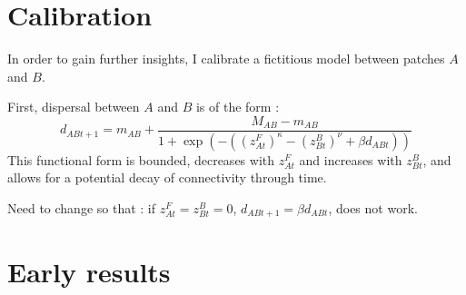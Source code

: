 \documentclass{article}
\begin{document}
\section{Calibration}
In order to gain further insights, I calibrate a fictitious model between patches $A$ and $B$. 

First, dispersal between $A$ and $B$ is of the form :
\begin{equation}
d_{ABt+1} = m_{AB} + \frac{M_{AB} - m_{AB}}{1+ \exp(-((z_{At}^F)^\kappa - (z_{Bt}^B)^\nu + \beta d_{ABt}))}
\end{equation}
This functional form is bounded, decreases with $z_{At}^F$ and increases with $z_{Bt}^B$, and allows for a potential decay of connectivity through time.

Need to change so that : if $z_{At}^F= z_{Bt}^B = 0$, $d_{ABt+1} = \beta d_{ABt}$, does not work. 


\section{Early results}
\end{document}
